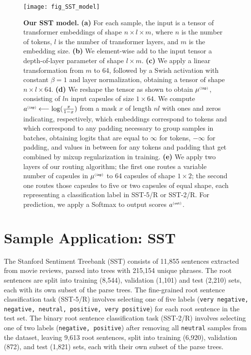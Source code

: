 \documentclass[11pt,a4paper]{article}
\begin{document}
\begin{figure*}[t]
	\vskip 0.1in
	\begin{center}
		\centerline{\texttt{[image: fig\_SST\_model]}}
		\caption{\textbf{Our SST model.} \textbf{(a)} For each sample, the input is a tensor of transformer embeddings of shape $n \times l \times m$, where $n$ is the number of tokens, $l$ is the number of transformer layers, and $m$ is the embedding size. \textbf{(b)} We element-wise add to the input tensor a depth-of-layer parameter of shape $l \times m$. \textbf{(c)} We apply a linear transformation from $m$ to 64, followed by a Swish activation with constant $\beta = 1$ and layer normalization, obtaining a tensor of shape $n \times l \times 64$. \textbf{(d)} We reshape the tensor as shown to obtain $\mu^{{\scriptscriptstyle\tt (inp)}}$, consisting of $ln$ input capsules of size $1 \times 64$. We compute $a^{{\scriptscriptstyle\tt (inp)}} \longleftarrow \log(\frac{x}{1 -x})$ from a mask $x$ of length $nl$ with ones and zeros indicating, respectively, which embeddings correspond to tokens and which correspond to any padding necessary to group samples in batches, obtaining logits that are equal to $\infty$ for tokens, $-\infty$ for padding, and values in between for any tokens and padding that get combined by mixup regularization in training. \textbf{(e)} We apply two layers of our routing algorithm; the first one routes a variable number of capsules in  $\mu^{{\scriptscriptstyle\tt (inp)}}$ to 64 capsules of shape $1 \times 2$; the second one routes those capsules to five or two capsules of equal shape, each representing a classification label in SST-5/R or SST-2/R. For prediction, we apply a Softmax to output scores $a^{{\scriptscriptstyle\tt (out)}}$.}
		\label{fig:SST5R_model}
	\end{center}
	\vskip -0.2in
\end{figure*}

\section{Sample Application: SST}
\label{sec:SST5R_discussion}

The Stanford Sentiment Treebank (SST) \cite{brusilovsky:socher2013recursive} consists of 11,855 sentences extracted from movie reviews, parsed into trees with 215,154 unique phrases. The root sentences are split into training (8,544), validation (1,101) and test (2,210) sets, each with its own subset of the parse trees. The fine-grained root sentence classification task (SST-5/R) involves selecting one of five labels ({\tt \small very negative, negative, neutral, positive, very positive}) for each root sentence in the test set. The binary root sentence classification task (SST-2/R) involves selecting one of two labels ({\tt \small negative, positive}) after removing all {\tt \small neutral} samples from the dataset, leaving 9,613 root sentences, split into training (6,920), validation (872), and test (1,821) sets, each with their own subset of the parse trees.
\end{document}
